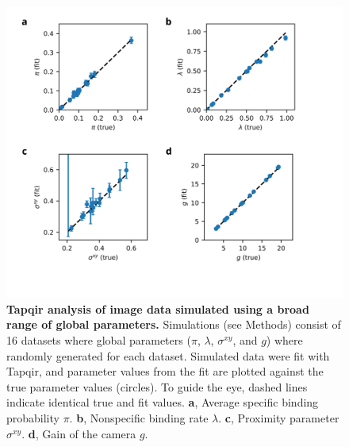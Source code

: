 \begin{figure}[t]
\centering
\includegraphics[width=150mm]{figures/sup2/sup2.png}
\caption{\textbf{Tapqir analysis of image data simulated using a broad range of global parameters.} Simulations (see Methods) consist of 16 datasets where global parameters ($\pi$, $\lambda$, $\sigma^{xy}$, and $g$) where randomly generated for each dataset. Simulated data were fit with Tapqir, and parameter values from the fit are plotted against the true parameter values (circles). To guide the eye, dashed lines  indicate identical true and fit values. \textbf{a}, Average specific binding probability $\pi$. \textbf{b}, Nonspecific binding rate $\lambda$. \textbf{c}, Proximity parameter $\sigma^{xy}$. \textbf{d}, Gain of the camera $g$. }
\label{fig:tapqir_global}
\end{figure}

